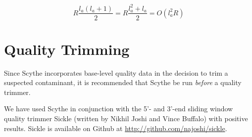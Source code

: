 \documentclass{bioinfo}
\begin{document}
$$ R \frac{l_a(l_a + 1)}{2} = R \frac{l_a^2 + l_a}{2} = O(l_a^2 R)$$

\section{Quality Trimming}

Since Scythe incorporates base-level quality data in the decision to
trim a suspected contaminant, it is recommended that Scythe be run
\emph{before} a quality trimmer.

We have used Scythe in conjunction with the 5'- and 3'-end sliding
window quality trimmer Sickle (written by Nikhil Joshi and Vince
Buffalo) with positive results. Sickle is available on Github at
\href{http://github.com/najoshi/sickle}{http://github.com/najoshi/sickle}.



\end{document}
